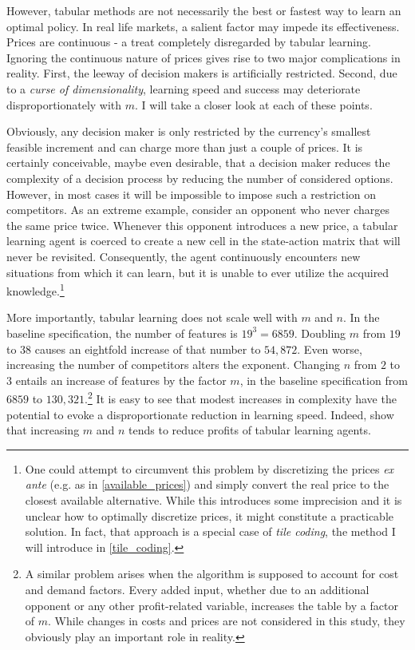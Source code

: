 However, tabular methods are not necessarily the best or fastest way to learn an optimal policy. In real life markets, a salient factor may impede its effectiveness. Prices are continuous - a treat completely disregarded by tabular learning. Ignoring the continuous nature of prices gives rise to two major complications in reality. First, the leeway of decision makers is artificially restricted. Second, due to a \emph{curse of dimensionality}, learning speed and success may deteriorate disproportionately with $m$. I will take a closer look at each of these points.

Obviously, any decision maker is only restricted by the currency's smallest feasible increment and can charge more than just a couple of prices. It is certainly conceivable, maybe even desirable, that a decision maker reduces the complexity of a decision process by reducing the number of considered options. However, in most cases it will be impossible to impose such a restriction on competitors. As an extreme example, consider an opponent who never charges the same price twice. Whenever this opponent introduces a new price, a tabular learning agent is coerced to create a new cell in the state-action matrix that will never be revisited. Consequently, the agent continuously encounters new situations from which it can learn, but it is unable to ever utilize the acquired knowledge.\footnote{One could attempt to circumvent this problem by discretizing the prices \emph{ex ante} (e.g. as in \autoref{available_prices}) and simply convert the real price to the closest available alternative. While this introduces some imprecision and it is unclear how to optimally discretize prices, it might constitute a practicable solution. In fact, that approach is a special case of \emph{tile coding}, the method I will introduce in \autoref{tile_coding}.}

More importantly, tabular learning does not scale well with $m$ and $n$. In the baseline specification, the number of features is $19^3 = 6859$. Doubling $m$ from $19$ to $38$ causes an eightfold increase of that number to $54,872$. Even worse, increasing the number of competitors alters the exponent. Changing $n$ from $2$ to $3$ entails an increase of features by the factor $m$, in the baseline specification from $6859$ to $130,321$.\footnote{A similar problem arises when the algorithm is supposed to account for cost and demand factors. Every added input, whether due to an additional opponent or any other profit-related variable, increases the table by a factor of $m$. While changes in costs and prices are not considered in this study, they obviously play an important role in reality.} It is easy to see that modest increases in complexity have the potential to evoke a disproportionate reduction in learning speed. Indeed, \textcite{calvano_artificial_2020} show that increasing $m$ and $n$ tends to reduce profits of tabular learning agents.

